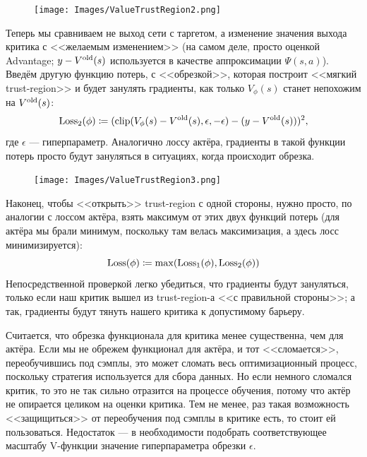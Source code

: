 \begin{figure}
\centering
\texttt{[image: Images/ValueTrustRegion2.png]}
\end{figure}
Теперь мы сравниваем не выход сети с таргетом, а изменение значения выхода критика с <<желаемым изменением>> (на самом деле, просто оценкой Advantage; $y \HM- V^{\old}(s)$ используется в качестве аппроксимации $\Psi(s, a)$). Введём другую функцию потерь, с <<обрезкой>>, которая построит <<мягкий trust-region>> и будет занулять градиенты, как только $V_{\phi}(s)$ станет непохожим на $V^{\mathrm{old}}(s)$:
$$\operatorname{Loss}_2(\phi) \coloneqq (\mathrm{clip}(V_{\phi}(s) - V^{\mathrm{old}}(s), \epsilon, -\epsilon) - (y - V^{\mathrm{old}}(s)))^2,$$
где $\epsilon$ --- гиперпараметр. Аналогично лоссу актёра, градиенты в такой функции потерь просто будут зануляться в ситуациях, когда происходит обрезка.

\begin{figure}
\vspace{-0.7cm}
\centering
\texttt{[image: Images/ValueTrustRegion3.png]}
\end{figure}
Наконец, чтобы <<открыть>> trust-region с одной стороны, нужно просто, по аналогии с лоссом актёра, взять максимум от этих двух функций потерь (для актёра мы брали минимум, поскольку там велась максимизация, а здесь лосс минимизируется):
$$\operatorname{Loss}(\phi) \coloneqq \max(\operatorname{Loss}_1(\phi), \operatorname{Loss}_2(\phi))$$
Непосредственной проверкой легко убедиться, что градиенты будут зануляться, только если наш критик вышел из trust-region-а <<с правильной стороны>>; а так, градиенты будут тянуть нашего критика к допустимому барьеру.

\begin{remark}
Считается, что обрезка функционала для критика менее существенна, чем для актёра. Если мы не обрежем функционал для актёра, и тот <<сломается>>, переобучившись под сэмплы, это может сломать весь оптимизационный процесс, поскольку стратегия используется для сбора данных. Но если немного сломался критик, то это не так сильно отразится на процессе обучения, потому что актёр не опирается целиком на оценки критика. Тем не менее, раз такая возможность <<защищиться>> от переобучения под сэмплы в критике есть, то стоит ей пользоваться. Недостаток --- в необходимости подобрать соответствующее масштабу V-функции значение гиперпараметра обрезки $\epsilon$.
\end{remark}

